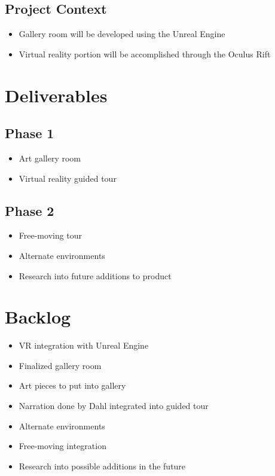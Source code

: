 \subsection*{Project Context}
\begin{itemize}
\item Gallery room will be developed using the Unreal Engine
\item Virtual reality portion will be accomplished through the Oculus Rift
\end{itemize}

\section*{Deliverables}
\hrulefill
\subsection*{Phase 1}
\begin{itemize}
\item Art gallery room 
\item Virtual reality guided tour
\end{itemize}

\subsection*{Phase 2}
\begin{itemize}
\item Free-moving tour
\item Alternate environments
\item Research into future additions to product
\end{itemize}

\section*{Backlog}
\hrulefill
\begin{itemize}
\item VR integration with Unreal Engine
\item Finalized gallery room
\item Art pieces to put into gallery
\item Narration done by Dahl integrated into guided tour
\item Alternate environments
\item Free-moving integration
\item Research into possible additions in the future
\end{itemize}

